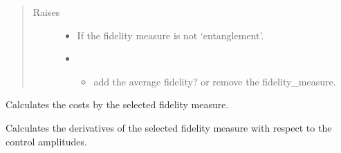 \documentclass[letterpaper,10pt,english]{sphinxmanual}
\begin{document}
\begin{fulllineitems}
\begin{fulllineitems}
\begin{quote}
\begin{description}
\end{description}\end{quote}

\end{fulllineitems}

\begin{quote}\begin{description}
\item[{Raises}] \leavevmode\begin{itemize}
\item {} 
 \textendash{} If the fidelity measure is not ‘entanglement’.

\item {} 
 \textendash{} \begin{itemize}
\item {} 
add the average fidelity? or remove the fidelity\_measure.

\end{itemize}


\end{itemize}

\end{description}\end{quote}

\begin{fulllineitems}
\label{\detokenize{qsim:qsim.cost_functions.OperationInfidelity.costs}}
Calculates the costs by the selected fidelity measure.

\end{fulllineitems}


\begin{fulllineitems}
\label{\detokenize{qsim:qsim.cost_functions.OperationInfidelity.grad}}
Calculates the derivatives of the selected fidelity measure with
respect to the control amplitudes.

\end{fulllineitems}


\end{fulllineitems}
\end{document}
